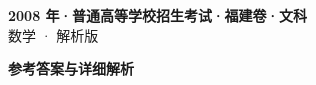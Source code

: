 \documentclass[zihao=-4, a4paper]{ctexart}
\begin{document}
\begin{center}
  {\Large\bfseries 2008 年·普通高等学校招生考试·福建卷·文科}\\[4pt]
  {\large 数学 · 解析版}
\end{center}
\medskip
{}

\clearpage
{}
\begin{center}{\Large\bfseries 参考答案与详细解析}\end{center}
\medskip

\end{document}
